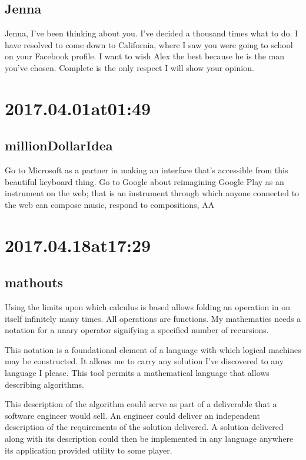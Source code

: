 \subsection*{ Jenna }
Jenna, I've been thinking about you. I've decided a thousand times what to do. I have resolved to come down to California, where I saw you were going to school on your Facebook profile. I want to wish Alex the best because he is the man you've chosen. Complete is the only respect I will show your opinion.

\section*{ 2017.04.01at01:49 }
\subsection*{ millionDollarIdea }
Go to Microsoft as a partner in making an interface that's accessible from this beautiful keyboard thing. Go to Google about reimagining Google Play as an instrument on the web; that is an instrument through which anyone connected to the web can compose music, respond to compositions, AA

\section*{ 2017.04.18at17:29 }
\subsection*{ mathouts }
Using the limits upon which calculus is based allows folding an operation in on itself infinitely many times. All operations are functions. My mathematics needs a notation for a unary operator signifying a specified number of recursions.

This notation is a foundational element of a language with which logical machines may be constructed. It allows me to carry any solution I've discovered to any language I please. This tool permits a mathematical language that allows describing algorithms.

This description of the algorithm could serve as part of a deliverable that a software engineer would sell. An engineer could deliver an independent description of the requirements of the solution delivered. A solution delivered along with its description could then be implemented in any language anywhere its application provided utility to some player.
